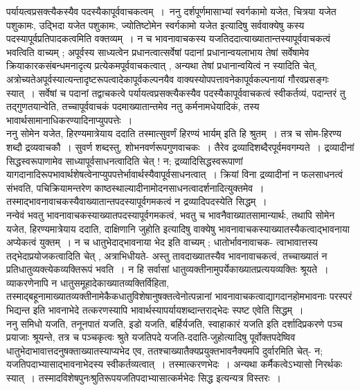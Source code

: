 \documentclass[11pt, openany]{book}
\begin{document}
 पर्यायत्वप्रसक्त्यैकस्यैव पदस्यैकापूर्ववाचकत्वम्~।~{\br ननु} {\qt दर्शपूर्णमासाभ्यां स्वर्गकामो यजेत, चित्रया यजेत पशुकामः, उद्भिदा यजेत पशुकामः, ज्योतिष्टोमेन स्वर्गकामो यजेत} इत्यादिषु सर्ववाक्येषु कस्य पदस्यापूर्वप्रतिपादकत्वमिति वक्तव्यम्~। न च भावनावाचकस्य यजतिददात्याख्यातान्तस्यापूर्ववाचकत्वं भवत्विति वाच्यम् ; अपूर्वस्य साध्यत्वेन प्रधानत्वात्सर्वेषां पदानां प्रधानान्वयलाभाय तेषां सर्वेषामेव क्रियाकारकसंबन्धमनादृत्य प्रत्येकमपूर्ववाचकत्वात् , अन्यथा तेषां प्रधानान्वयित्वं न स्यादिति
चेत्, अत्रोच्यते\textendash अपूर्वस्यात्यन्तादृष्टरूपत्वादेकापूर्वकल्पनयैव वाक्यस्योपपत्तावनेकापूर्वकल्पनायां गौरवप्रसङ्गः स्यात्~। सर्वेषां च पदानां तद्वाचकत्वे पर्यायत्वप्रसक्त्यैकस्यैव पदस्यैकापूर्ववाचकत्वं स्वीकर्तव्यं, पदान्तरं तु तद्गुणतयान्वेति, तच्चापूर्ववाचकं पदमाख्यातान्तमेव नतु कर्मनामधेयादिकं, तस्य भावार्थसामानाधिकरण्यादिनाप्युपपत्तेः~।\\

 {\br ननु} {\qt सोमेन यजेत, हिरण्यमात्रेयाय ददाति तस्मात्सुवर्णं हिरण्यं भार्यम्} इति हि श्रुतम्~। तत्र च {\qt सोम-हिरण्य} शब्दौ द्रव्यवाचकौ~। {\qt सुवर्ण} शब्दस्तु, शोभनवर्णरूपगुणवाचकः~। तैरेव द्रव्यादिशब्दैरपूर्वमवगम्यते~। द्रव्यादीनां सिद्धस्वरूपाणामेव साध्यापूर्वसाधनत्वादिति चेत् ! न; द्रव्यादिसिद्धस्वरूपाणां
यागदानादिरूपभावार्थशेषत्वेनाप्युपपत्तेर्भावार्थस्यैवापूर्वसाधनत्वात्~। क्रियां विना द्रव्यादीनां न फलसाधनत्वं संभवति, पचिक्रियामन्तरेण काष्ठस्थाल्यादीनामोदनसाधनत्वादर्शनादित्युक्तमेव~। तस्माद्भावनावाचकस्यैवाख्यातान्तपदस्यापूर्वगमकत्वं न द्रव्यादिपदस्येति
सिद्धम्~।\\

 {\br नन्वेवं} भवतु भावनावाचकस्याख्यातपदस्यापूर्वगमकत्वं, भवतु च भावनैवाख्यातसामान्यार्थः, तथापि {\qt सोमेन यजेत, हिरण्यमात्रेयाय ददाति, दाक्षिणानि जुहोति} इत्यादिषु वाक्येषु भावनावाचकस्याख्यातस्यैकत्वाद्भावनाया अप्येकत्वं युक्तम्~। न च धातुभेदाद्भावनाया भेद इति वाच्यम् ; धातोर्भावनावाचक-
\newpage
\fancyhead[LO]{अंशत्रयम् ]}
\noindent
त्वाभावात्तस्य तद्भेदाप्रयोजकत्वादिति चेत् , अत्राभिधीयते- अस्तु तावदाख्यातस्यैव भावनावाचकत्वं, तच्चाख्यातं न प्रतिधातुव्यक्त्येकव्यक्तिरूपं भवति~। न हि सर्वासां
धातुव्यक्तीनामुपर्येकाख्यातप्रत्ययव्यक्तिः श्रूयते~। व्याकरणेनापि न धातुसमूहादेकाख्यातव्यक्तिर्विहिता, तस्माद्बहूनामाख्यातव्यक्तीनामेकैकधातुविशेषानुषक्तत्वेनोत्पन्नानां
भावनावाचकत्वाद्यागदानहोमभावनाः परस्परं भिद्यन्त इति भावनाभेदे तत्करणस्यापि भावार्थस्यापर्यायशब्दान्तराद्भेदः स्पष्ट एवेति सिद्धम्~।\\

 {\br ननु} {\qt समिधो यजति, तनूनपातं यजति, इडो यजति, बर्हिर्यजति, स्वाहाकारं यजति} इति दर्शादिप्रकरणे पञ्च प्रयाजाः श्रूयन्ते, तत्र च पञ्चकृत्वः श्रुते यजतिपदे यजति-ददाति-जुहोत्यादिषु पूर्वोक्तपदेष्विव धातुभेदाभावात्तदनुषक्ताख्यातस्याप्यभेद एव, ततश्चाख्यातैक्यप्रयुक्तभावनैक्यमपि दुर्वारमिति चेत्- न; यजतिपदाभ्यासाद्भावनाभेदस्य स्वीकर्तव्यत्वात्~। तस्मात्करणभेदः~। अन्यथा कर्मैकत्वेऽभ्यासो निरर्थकः स्यात्~। तस्मादविशेषपुनःश्रुतिरूपयजतिपदाभ्यासात्कर्मभेदः सिद्ध इत्यन्यत्र विस्तरः~।\\
\end{document}
